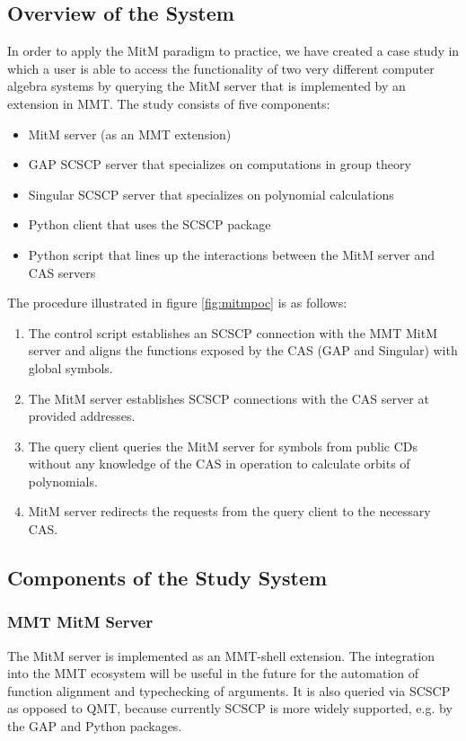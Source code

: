 \subsection{Overview of the System}
In order to apply the MitM paradigm to practice, we have created a case study in 
which a user is able to access the functionality of two very different computer 
algebra systems by querying the MitM server that is implemented by an extension in
MMT. The study consists of five components:
\begin{itemize}
  \item MitM server (as an MMT extension)
  \item GAP SCSCP server that specializes on computations in group theory
  \item Singular SCSCP server that specializes on polynomial calculations
  \item Python client that uses the SCSCP package
  \item Python script that lines up the interactions between the MitM server and CAS servers
\end{itemize}



The procedure illustrated in figure \ref{fig:mitmpoc} is as follows:
\begin{enumerate}
  \item The control script establishes an SCSCP connection with the MMT MitM 
    server and aligns the functions exposed by the CAS (GAP and Singular) with
    global symbols.
  \item The MitM server establishes SCSCP connections with the CAS server at
    provided addresses.
  \item The query client queries the MitM server for symbols from public CDs
    without any knowledge of the CAS in operation to calculate orbits of 
    polynomials.
  \item MitM server redirects the requests from the query client to the necessary
    CAS.
\end{enumerate}

\subsection{Components of the Study System}
\subsubsection{MMT MitM Server}
The MitM server is implemented as an MMT-shell extension. The integration into the
MMT ecosystem will be useful in the future for the automation of function 
alignment and typechecking of arguments. It is also queried via SCSCP as opposed 
to QMT, because currently SCSCP is more widely supported, e.g. by the GAP and 
Python packages.

